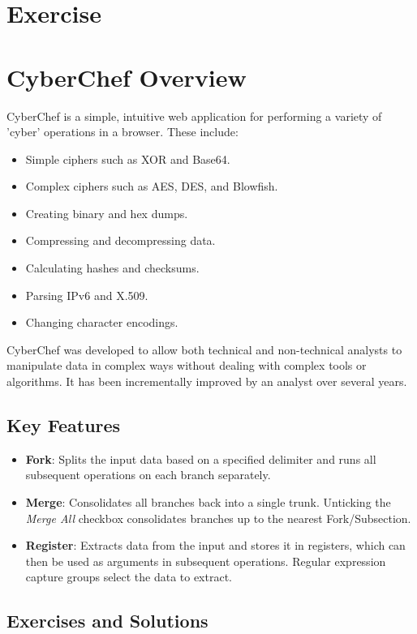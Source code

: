 \section{Exercise}

\section{CyberChef Overview}
CyberChef is a simple, intuitive web application for performing a variety of 'cyber' operations in a browser. These include:
\begin{itemize}
    \item Simple ciphers such as XOR and Base64.
    \item Complex ciphers such as AES, DES, and Blowfish.
    \item Creating binary and hex dumps.
    \item Compressing and decompressing data.
    \item Calculating hashes and checksums.
    \item Parsing IPv6 and X.509.
    \item Changing character encodings.
\end{itemize}

CyberChef was developed to allow both technical and non-technical analysts to manipulate data in complex ways without dealing with complex tools or algorithms. It has been incrementally improved by an analyst over several years.

\subsection{Key Features}
\begin{itemize}
    \item \textbf{Fork}: Splits the input data based on a specified delimiter and runs all subsequent operations on each branch separately.
    \item \textbf{Merge}: Consolidates all branches back into a single trunk. Unticking the \emph{Merge All} checkbox consolidates branches up to the nearest Fork/Subsection.
    \item \textbf{Register}: Extracts data from the input and stores it in registers, which can then be used as arguments in subsequent operations. Regular expression capture groups select the data to extract.
\end{itemize}

\subsection{Exercises and Solutions}

